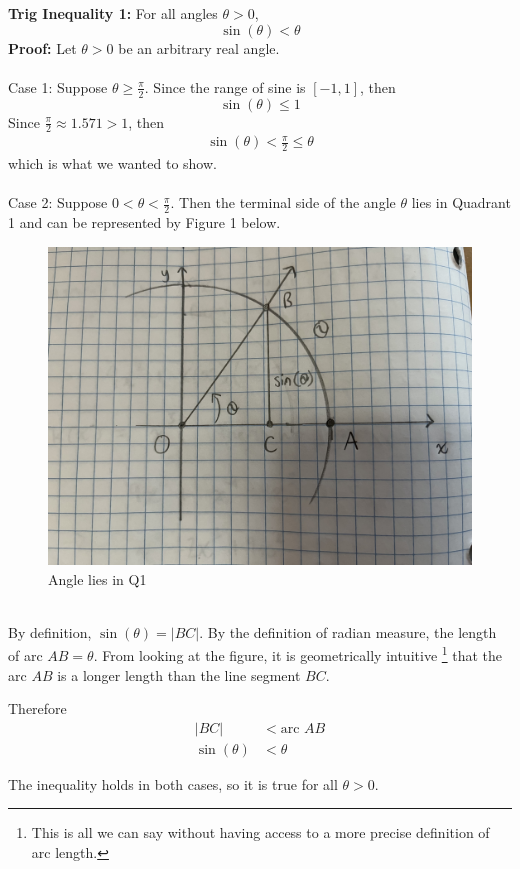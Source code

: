 \documentclass{article}
\begin{document}
	\textbf{Trig Inequality 1:} For all angles $\theta > 0$,
	$$\sin{(\theta)} < \theta$$
	\textbf{Proof:}
	Let $\theta > 0$ be an arbitrary real angle. \\\\
	Case 1: Suppose $\theta \geq \frac{\pi}{2}$. Since the range of sine is $[-1, 1]$, then
	$$\sin{(\theta)} \leq 1$$
	Since $\frac{\pi}{2} \approx 1.571 > 1$, then
	\begin{align*}
		\sin{(\theta)} < \frac{\pi}{2} \leq \theta
	\end{align*}
	which is what we wanted to show. \\\\
	Case 2: Suppose $0 < \theta < \frac{\pi}{2}$. Then the terminal side of the angle $\theta$ lies in Quadrant 1 and can be represented by Figure 1 below.
	\begin{figure}[h!]
		\includegraphics[width=\linewidth]{Trig_Figure.JPG}
		\caption{Angle lies in Q1}
	\end{figure} \\
	By definition, $\sin{(\theta)} = |BC|$. By the definition of radian measure, the length of arc $AB = \theta$. From looking at the figure, it is geometrically intuitive \footnote{This is all we can say without having access to a more precise definition of arc length.} that the arc $AB$ is a longer length than the line segment $BC$.
	
	Therefore
	\begin{align*}
		|BC| &< \text{arc } AB \\
		\sin{(\theta)} &< \theta
	\end{align*}
	
	The inequality holds in both cases, so it is true for all $\theta > 0$.
\end{document}
